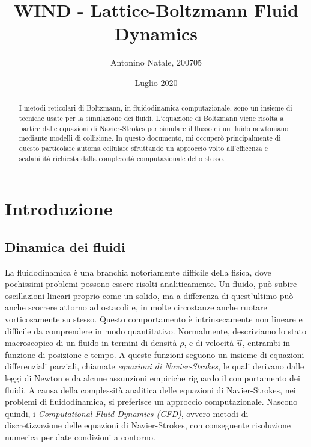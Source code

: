 \documentclass[12pt]{article}
\title{WIND - Lattice-Boltzmann Fluid Dynamics}
\author{Antonino Natale, 200705}
\date{Luglio 2020}
\begin{document}

\maketitle

\begin{abstract}
I metodi reticolari di Boltzmann, in fluidodinamica computazionale, sono un insieme di tecniche usate per la simulazione dei fluidi.
L'equazione di Boltzmann viene risolta a partire dalle equazioni di Navier-Strokes per simulare il flusso di un fluido newtoniano mediante modelli di collisione.
In questo documento, mi occuperò principalmente di questo particolare automa cellulare sfruttando un approccio volto all'efficenza e scalabilità richiesta dalla complessità computazionale dello stesso.
\end{abstract}


\tableofcontents
\newpage

\section{Introduzione}
\subsection{Dinamica dei fluidi}
La fluidodinamica è una branchia notoriamente difficile della fisica, dove pochissimi problemi possono essere risolti analiticamente.
Un fluido, può subire oscillazioni lineari proprio come un solido, ma a differenza di quest'ultimo può anche scorrere attorno ad ostacoli e, in molte circostanze anche ruotare vorticosamente su stesso.
Questo comportamento è intrinsecamente non lineare e difficile da comprendere in modo quantitativo.
Normalmente, descriviamo lo stato macroscopico di un fluido in termini di densità \( \rho \), e di velocità \( \vec{u} \), entrambi in funzione di posizione e tempo.
A queste funzioni seguono un insieme di equazioni differenziali parziali, chiamate \textit{equazioni di Navier-Strokes}, le quali derivano dalle leggi di Newton e da alcune assunzioni empiriche riguardo il comportamento dei fluidi.
A causa della complessità analitica delle equazioni di Navier-Strokes, nei problemi di fluidodinamica, si preferisce un approccio computazionale. Nascono quindi, i \textit{Computational Fluid Dynamics (CFD)}, ovvero metodi di discretizzazione delle equazioni di Navier-Strokes, con conseguente risoluzione numerica per date condizioni a contorno. 
\end{document}
